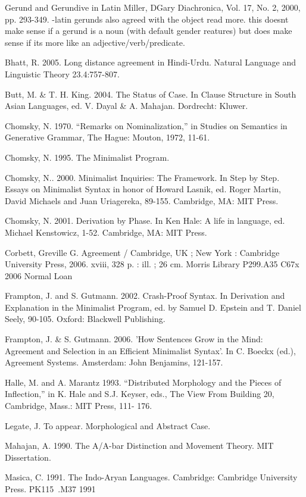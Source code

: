 \documentclass{article}
\begin{document}
\begin{reflist}

Gerund and Gerundive in Latin
Miller, DGary
Diachronica, Vol. 17, No. 2, 2000, pp. 293-349.
-latin gerunds also agreed with the object read more. this doesnt make sense if a gerund is a noun (with default gender reatures) but does make sense if its more like an adjective/verb/predicate.


Bhatt, R. 2005. Long distance agreement in Hindi-Urdu. Natural Language and Linguistic Theory 23.4:757-807.

Butt, M. \& T. H. King. 2004. The Status of Case. In Clause Structure in South Asian Languages, ed. V. Dayal \& A. Mahajan. Dordrecht: Kluwer.

Chomsky, N. 1970. ``Remarks on Nominalization,” in Studies on Semantics in Generative Grammar, The Hague: Mouton, 1972, 11-61.

Chomsky, N. 1995. The Minimalist Program.

Chomsky, N.. 2000. Minimalist Inquiries: The Framework. In Step by Step. Essays on Minimalist Syntax in honor of Howard Lasnik, ed. Roger Martin, David Michaels and Juan Uriagereka, 89-155. Cambridge, MA: MIT Press.

Chomsky, N. 2001. Derivation by Phase. In Ken Hale: A life in language, ed. Michael Kenstowicz, 1-52. Cambridge, MA: MIT Press.

Corbett, Greville G.
Agreement /
Cambridge, UK ; New York : Cambridge University Press, 2006.
xviii, 328 p. : ill. ; 26 cm.
Morris Library  P299.A35 C67x 2006 Normal Loan

Frampton, J. and S. Gutmann. 2002. Crash-Proof Syntax. In Derivation and Explanation in the Minimalist Program, ed. by Samuel D. Epstein and T. Daniel Seely, 90-105. Oxford: Blackwell Publishing.

Frampton, J. \& S. Gutmann. 2006. 'How Sentences Grow in the Mind: Agreement and Selection in an Efficient Minimalist Syntax'. In C. Boeckx (ed.), Agreement Systems. Amsterdam: John Benjamins, 121-157.

Halle, M. and A. Marantz 1993. ``Distributed Morphology and the Pieces of Inflection,” in K. Hale and S.J. Keyser, eds., The View From Building 20, Cambridge, Mass.: MIT Press, 111- 176.

Legate, J. To appear. Morphological and Abstract Case.

Mahajan, A. 1990. The A/A-bar Distinction and Movement Theory. MIT Dissertation.

Masica, C. 1991. The Indo-Aryan Languages. Cambridge: Cambridge University Press. PK115 .M37 1991 


\end{reflist}
\end{document}
